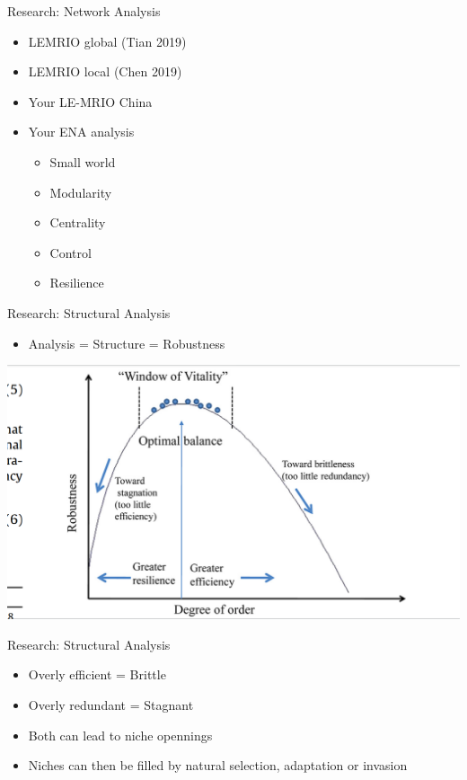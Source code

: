 \begin{frame}{Research: Network Analysis}

\begin{itemize}
\item
  LEMRIO global (Tian 2019)
\item
  LEMRIO local (Chen 2019)
\item
  Your LE-MRIO China
\item
  Your ENA analysis

  \begin{itemize}
  \item
    Small world
  \item
    Modularity
  \item
    Centrality
  \item
    Control
  \item
    Resilience
  \end{itemize}
\end{itemize}

\end{frame}

\begin{frame}{Research: Structural Analysis}

\begin{itemize}
\item
  Analysis = Structure = Robustness
\end{itemize}

\begin{center}\includegraphics[width=0.5\linewidth]{images/Fath_2015_Fig6} \end{center}

\end{frame}

\begin{frame}{Research: Structural Analysis}

\begin{itemize}
\item
  Overly efficient = Brittle
\item
  Overly redundant = Stagnant
\item
  Both can lead to niche opennings
\item
  Niches can then be filled by natural selection, adaptation or invasion
\end{itemize}

\end{frame}

